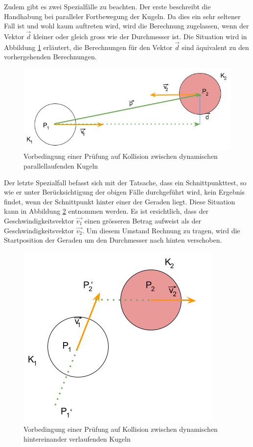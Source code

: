 Zudem gibt es zwei Spezialfälle zu beachten. Der erste beschreibt die Handhabung bei paralleler Fortbewegung
der Kugeln. Da dies ein sehr seltener Fall ist und
wohl kaum auftreten wird, wird die Berechnung zugelassen, wenn der Vektor $\vec{d}$ kleiner oder gleich gross
wie der Durchmesser ist. Die Situation wird in Abbildung \ref{fig:kugelkollision_vorbedingung_dynamisch_parallel} erläutert, die Berechnungen für den Vektor $\vec{d}$
sind äquivalent zu den vorhergehenden Berechnungen.
\begin{figure}[h!]
    \begin{center}
        \includegraphics[width=0.4\linewidth]{../common/03_billiard_ai/resources/26_vorbedingung_kugelkollision_dynamisch_parallel.png}
    \end{center}
    \caption{Vorbedingung einer Prüfung auf Kollision zwischen dynamischen parallellaufenden Kugeln}
    \label{fig:kugelkollision_vorbedingung_dynamisch_parallel}
\end{figure}

Der letzte Spezialfall befasst sich mit der Tatsache, dass ein Schnittpunkttest, so wie er unter Berücksichtigung der
obigen Fälle durchgeführt wird, kein Ergebnis findet, wenn der Schnittpunkt hinter einer der Geraden liegt.
Diese Situation kann in Abbildung \ref{fig:kugelkollision_vorbedingung_dynamisch_hintereinander} entnommen werden.
Es ist ersichtlich, dass der Geschwindigkeitsvektor $\vec{v_1}$ einen grösseren Betrag aufweist als der
Geschwindigkeitsvektor $\vec{v_2}$. Um diesem Umstand Rechnung zu tragen, wird die Startposition der Geraden um den
Durchmesser nach hinten verschoben.
\begin{figure}[h!]
    \begin{center}
        \includegraphics[width=0.4\linewidth]{../common/03_billiard_ai/resources/27_vorbedingung_kugelkollision_dynamisch_hintereinander.png}
    \end{center}
    \caption{Vorbedingung einer Prüfung auf Kollision zwischen dynamischen hintereinander verlaufenden Kugeln}
    \label{fig:kugelkollision_vorbedingung_dynamisch_hintereinander}
\end{figure}

